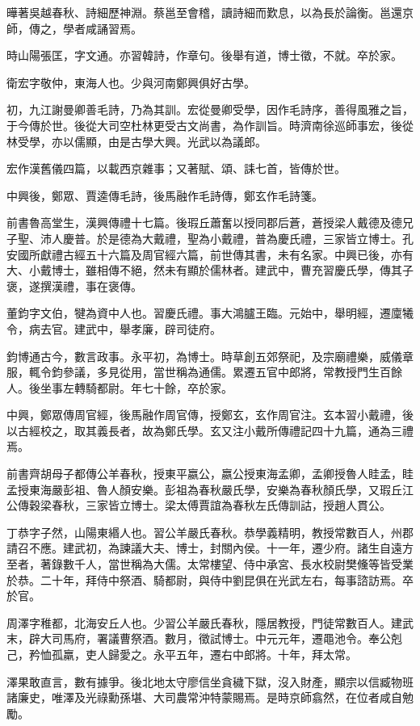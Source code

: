 \begin{pinyinscope}
曄著吳越春秋、詩細歷神淵。蔡邕至會稽，讀詩細而歎息，以為長於論衡。邕還京師，傳之，學者咸誦習焉。

時山陽張匡，字文通。亦習韓詩，作章句。後舉有道，博士徵，不就。卒於家。

衛宏字敬仲，東海人也。少與河南鄭興俱好古學。

初，九江謝曼卿善毛詩，乃為其訓。宏從曼卿受學，因作毛詩序，善得風雅之旨，于今傳於世。後從大司空杜林更受古文尚書，為作訓旨。時濟南徐巡師事宏，後從林受學，亦以儒顯，由是古學大興。光武以為議郎。

宏作漢舊儀四篇，以載西京雜事；又著賦、頌、誄七首，皆傳於世。

中興後，鄭眾、賈逵傳毛詩，後馬融作毛詩傳，鄭玄作毛詩箋。

前書魯高堂生，漢興傳禮十七篇。後瑕丘蕭奮以授同郡后蒼，蒼授梁人戴德及德兄子聖、沛人慶普。於是德為大戴禮，聖為小戴禮，普為慶氏禮，三家皆立博士。孔安國所獻禮古經五十六篇及周官經六篇，前世傳其書，未有名家。中興已後，亦有大、小戴博士，雖相傳不絕，然未有顯於儒林者。建武中，曹充習慶氏學，傳其子褒，遂撰漢禮，事在褒傳。

董鈞字文伯，犍為資中人也。習慶氏禮。事大鴻臚王臨。元始中，舉明經，遷廩犧令，病去官。建武中，舉孝廉，辟司徒府。

鈞博通古今，數言政事。永平初，為博士。時草創五郊祭祀，及宗廟禮樂，威儀章服，輒令鈞參議，多見從用，當世稱為通儒。累遷五官中郎將，常教授門生百餘人。後坐事左轉騎都尉。年七十餘，卒於家。

中興，鄭眾傳周官經，後馬融作周官傳，授鄭玄，玄作周官注。玄本習小戴禮，後以古經校之，取其義長者，故為鄭氏學。玄又注小戴所傳禮記四十九篇，通為三禮焉。

前書齊胡母子都傳公羊春秋，授東平嬴公，嬴公授東海孟卿，孟卿授魯人眭孟，眭孟授東海嚴彭祖、魯人顏安樂。彭祖為春秋嚴氏學，安樂為春秋顏氏學，又瑕丘江公傳穀梁春秋，三家皆立博士。梁太傅賈誼為春秋左氏傳訓詁，授趙人貫公。

丁恭字子然，山陽東緡人也。習公羊嚴氏春秋。恭學義精明，教授常數百人，州郡請召不應。建武初，為諫議大夫、博士，封關內侯。十一年，遷少府。諸生自遠方至者，著錄數千人，當世稱為大儒。太常樓望、侍中承宮、長水校尉樊儵等皆受業於恭。二十年，拜侍中祭酒、騎都尉，與侍中劉昆俱在光武左右，每事諮訪焉。卒於官。

周澤字稚都，北海安丘人也。少習公羊嚴氏春秋，隱居教授，門徒常數百人。建武末，辟大司馬府，署議曹祭酒。數月，徵試博士。中元元年，遷黽池令。奉公剋己，矜恤孤羸，吏人歸愛之。永平五年，遷右中郎將。十年，拜太常。

澤果敢直言，數有據爭。後北地太守廖信坐貪穢下獄，沒入財產，顯宗以信臧物班諸廉史，唯澤及光祿勳孫堪、大司農常沖特蒙賜焉。是時京師翕然，在位者咸自勉勵。


\end{pinyinscope}
